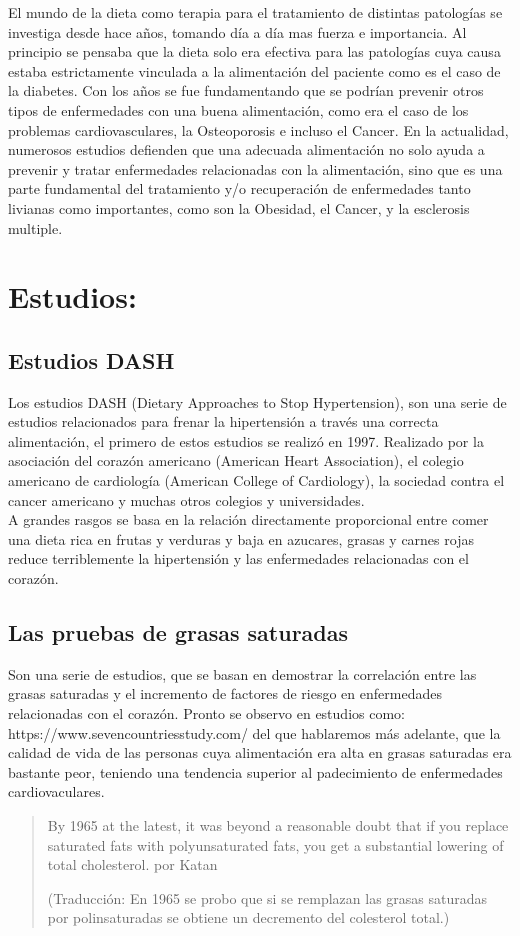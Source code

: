 
El mundo de la dieta como terapia para el tratamiento de distintas patologías se investiga desde hace años, tomando día a día mas fuerza e importancia. Al principio se pensaba que la dieta solo era efectiva para las patologías cuya causa estaba estrictamente vinculada a la alimentación del paciente como es el caso de la diabetes. Con los años se fue fundamentando que se podrían prevenir otros tipos de enfermedades con una buena alimentación, como era el caso de los problemas cardiovasculares, la Osteoporosis e incluso el Cancer. En la actualidad, numerosos estudios defienden que una adecuada alimentación no solo ayuda a prevenir y tratar enfermedades relacionadas con la alimentación, sino que es una parte fundamental del tratamiento y/o recuperación de enfermedades tanto livianas como importantes, como son la Obesidad, el Cancer, y la esclerosis multiple.
\section{Estudios:} 
\subsection{Estudios DASH} 
Los estudios DASH (Dietary Approaches to Stop Hypertension), son una serie de estudios relacionados para frenar la hipertensión a través una correcta alimentación, el primero de estos estudios se realizó en 1997. Realizado por la asociación del corazón americano (American Heart Association), el colegio americano de cardiología (American College of Cardiology), la sociedad contra el cancer americano y muchas otros colegios y universidades.\\
A grandes rasgos se basa en la relación directamente proporcional entre comer una dieta rica en frutas y verduras y baja en azucares, grasas y carnes rojas reduce terriblemente la hipertensión y las enfermedades relacionadas con el corazón.\\
\subsection{Las pruebas de grasas saturadas}
Son una serie de estudios, que se basan en demostrar la correlación entre las grasas saturadas y el incremento de factores de riesgo en enfermedades relacionadas con el corazón.
Pronto se observo en estudios como: https://www.sevencountriesstudy.com/ del que hablaremos más adelante, que la calidad de vida de las personas cuya alimentación era alta en grasas saturadas era bastante peor, teniendo una tendencia superior al padecimiento de enfermedades cardiovaculares.\\
\begin{quote}
By 1965 at the latest, it was beyond a reasonable doubt that if you replace saturated fats with polyunsaturated fats, you get a substantial lowering of total cholesterol. por Katan

(Traducción: En 1965 se probo que si se remplazan las grasas saturadas por polinsaturadas se obtiene un decremento del colesterol total.)
\end{quote}

